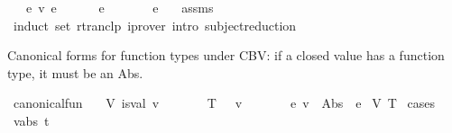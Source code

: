 \begin{isabellebody}
\ \ \ {\isachardoublequoteopen}e\ {\isasymrightarrow}\isactrlsub v\isactrlsup {\isacharasterisk}{\kern0pt}\ e{\isacharprime}{\kern0pt}{\isachardoublequoteclose}\isanewline
\ \ \ \ {\isachardoublequoteopen}{\isasymGamma}\ {\isasymturnstile}\ e\ {\isacharcolon}{\kern0pt}\ {\isasymtau}{\isachardoublequoteclose}\isanewline
\ \ \ {\isachardoublequoteopen}{\isasymGamma}\ {\isasymturnstile}\ e{\isacharprime}{\kern0pt}\ {\isacharcolon}{\kern0pt}\ {\isasymtau}{\isachardoublequoteclose}\isanewline
%
\isadelimproof
%
\endisadelimproof
%
\isatagproof
{}\isamarkupfalse%
\ assms\isanewline
\ \ \isamarkupfalse%
\ {\isacharparenleft}{\kern0pt}induct\ set{\isacharcolon}{\kern0pt}\ rtranclp{\isacharparenright}{\kern0pt}\ {\isacharparenleft}{\kern0pt}iprover\ intro{\isacharcolon}{\kern0pt}\ subject{\isacharunderscore}{\kern0pt}reduction{\isacharparenright}{\kern0pt}{\isacharplus}{\kern0pt}%
\endisatagproof
{\isafoldproof}%
%
\isadelimproof
%
\endisadelimproof
%
\isadelimdocument
%
\endisadelimdocument
%
\isatagdocument
%
\isamarkuptrue%
%
\endisatagdocument
{\isafolddocument}%
%
\isadelimdocument
%
\endisadelimdocument
%
\begin{isamarkuptext}%
Canonical forms for function types under CBV:
  if a closed value has a function type, it must be an Abs.%
\end{isamarkuptext}\isamarkuptrue%
\isamarkupfalse%
\ canonical{\isacharunderscore}{\kern0pt}fun{\isacharcolon}{\kern0pt}\isanewline
\ \ \ V{\isacharcolon}{\kern0pt}\ {\isachardoublequoteopen}is{\isacharunderscore}{\kern0pt}val\ v{\isachardoublequoteclose}\isanewline
\ \ \ \ \ \ \ T{\isacharcolon}{\kern0pt}\ {\isachardoublequoteopen}{\isacharbrackleft}{\kern0pt}{\isacharbrackright}{\kern0pt}\ {\isasymturnstile}\ v\ {\isacharcolon}{\kern0pt}\ {\isasymtau}{}\ {\isasymRightarrow}\ {\isasymtau}{}{\isachardoublequoteclose}\isanewline
\ \ \ {\isachardoublequoteopen}{\isasymexists}e{\isachardot}{\kern0pt}\ v\ {\isacharequal}{\kern0pt}\ Abs\ {\isasymtau}{}\ e{\isachardoublequoteclose}\isanewline
%
\isadelimproof
%
\endisadelimproof
%
\isatagproof
{}\isamarkupfalse%
\ V\ T\isanewline
{}\isamarkupfalse%
\ cases\isanewline
\ \ \isamarkupfalse%
\ {\isacharparenleft}{\kern0pt}v{\isacharunderscore}{\kern0pt}abs\ t{\isacharparenright}{\kern0pt}\isanewline

\end{isabellebody}
